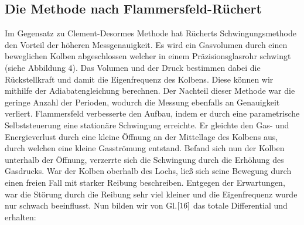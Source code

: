 \documentclass{article}
\begin{document}
{\begin{center}
\begin{minipage}{\linewidth}
\centering
{}
\label{wtd}
\end{minipage}
\end{center}

\subsection{Die Methode nach Flammersfeld-Rüchert}
Im Gegensatz zu Clement-Desormes Methode hat Rücherts Schwingungsmethode den Vorteil der höheren Messgenauigkeit. Es wird ein Gasvolumen durch einen beweglichen Kolben abgeschlossen welcher in einem Präzisionsglasrohr schwingt (siehe Abbildung 4). Das Volumen und der Druck bestimmen dabei die Rückstellkraft und damit die Eigenfrequenz des Kolbens. Diese können wir mithilfe der Adiabatengleichung berechnen. Der Nachteil dieser Methode war die geringe Anzahl der Perioden, wodurch die Messung ebenfalls an Genauigkeit verliert. Flammersfeld verbesserte den Aufbau, indem er durch eine parametrische Selbststeuerung eine stationäre Schwingung erreichte. Er gleichte den Gas- und Energieverlust durch eine kleine Öffnung an der Mittellage des Kolbens aus, durch welchen eine kleine Gasströmung entstand.
Befand sich nun der Kolben unterhalb der Öffnung, verzerrte sich die Schwingung durch die Erhöhung des Gasdrucks. War der Kolben oberhalb des Lochs, ließ sich seine Bewegung durch einen freien Fall mit starker Reibung beschreiben. Entgegen der Erwartungen, war die Störung durch die Reibung sehr viel kleiner und die Eigenfrequenz wurde nur schwach beeinflusst.
\newpage
Nun bilden wir von Gl.\(\eqref{16}\) das totale Differential und erhalten:

}
\end{document}
